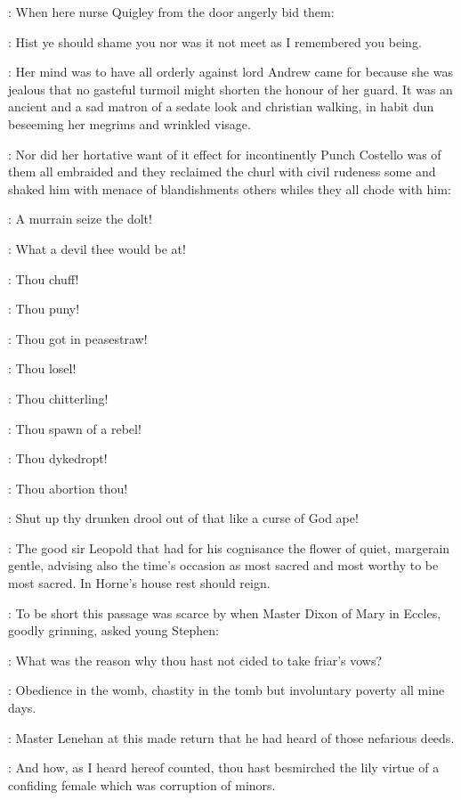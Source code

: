 :
When here nurse Quigley from the door angerly bid them:

\nursequigley:
Hist ye should shame you nor was it not meet as
I remembered you being.

:
Her mind was to have all orderly against lord
Andrew came for because she was jealous that no gasteful turmoil might
shorten the honour of her guard.
It was an ancient and a sad matron of a sedate look and christian walking,
in habit dun beseeming her megrims and wrinkled visage.

:
Nor did her hortative want of it effect for
incontinently Punch Costello was of them all embraided and they reclaimed
the churl with civil rudeness some and shaked him with menace of
blandishments others whiles they all chode with him:

\lynch:
A murrain seize the dolt!

\madden:
What a devil thee would be at!

\crotthers:
Thou chuff!

\dixon:
Thou puny!

\lenehan:
Thou got in peasestraw!

\lynch:
Thou losel!

\madden:
Thou chitterling!

\crotthers:
Thou spawn of a rebel!

\lenehan:
Thou dykedropt!

\dixon:
Thou abortion thou!

\stephen:
Shut up thy drunken drool out of that like a curse of God ape!

:
The good sir Leopold that had for his cognisance
the flower of quiet,
margerain gentle,
advising also the time's occasion
as most sacred and most worthy to be most sacred.
In Horne's house rest
should reign.



:
To be short this passage was scarce by when Master Dixon of Mary in
Eccles,
goodly grinning,
asked young Stephen:

\dixon:
What was the reason why thou hast not cided to take friar's vows?

\stephen:
Obedience in the womb,
chastity in the tomb
but involuntary poverty all mine days.

:
Master Lenehan at this made return that he had heard of
those nefarious deeds.

\lenehan:
And how,
as I heard hereof counted,
thou hast besmirched the lily
virtue of a confiding female which was corruption of minors.

